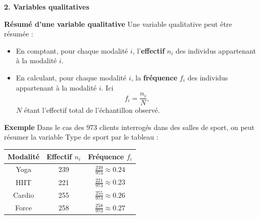 \documentclass[aspectratio=169,xcolor=dvipsnames]{beamer}
\begin{document}
\begin{frame}[plain]

\vfill

\begin{center}
{\huge \textcolor{nyubluedark}{\textbf{2. Variables qualitatives}}}
\end{center}

\vfill

\end{frame}

\begin{frame}

	\begin{block}{\textbf{Résumé d'une variable qualitative}}
	Une variable qualitative peut être résumée :
		\begin{itemize}
		\item En comptant, pour chaque modalité $i$, l'\textbf{effectif} $n_i$ des individus appartenant à la modalité $i$.
		\item En calculant, pour chaque modalité $i$, la \textbf{fréquence} $f_i$ des individus appartenant à la modalité $i$. Ici
			\[f_i = \frac{n_i}{N},\]
		$N$ étant l'effectif total de l'échantillon observé.
		\end{itemize}
	\end{block}

\end{frame}

\begin{frame}
	\begin{exampleblock}{\textbf{Exemple}}
	Dans le cas des 973 clients interrogés dans des salles de sport, on peut résumer la variable \og Type de sport \fg{} par le tableau :
		\begin{center}
		\begin{tabular}{ccc}
		\textbf{Modalité} & \textbf{Effectif} $n_i$ & \textbf{Fréquence} $f_i$ \\
		\hline
		Yoga & 239 & $\frac{239}{973}\approx 0.24$ \\
		HIIT & 221 & $\frac{221}{973}\approx 0.23$\\
		Cardio & 255 & $\frac{255}{973}\approx 0.26$\\
		Force & 258 & $\frac{258}{973}\approx 0.27$\\
		\hline
		\end{tabular}
		\end{center}
	\end{exampleblock}
\end{frame}
\end{document}

